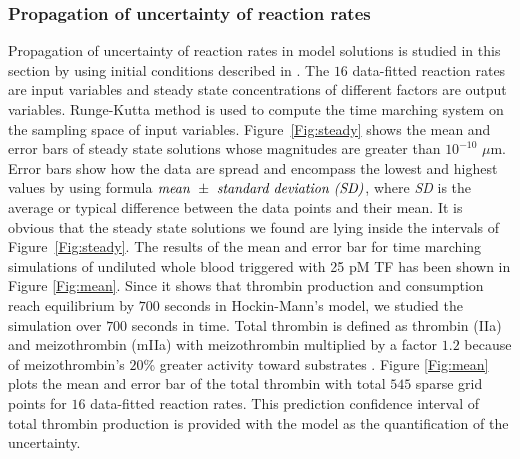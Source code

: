 \subsubsection*{Propagation of uncertainty of reaction rates}
\label{sec:uq}

Propagation of uncertainty of reaction rates in model solutions is
studied in this section by using initial conditions described in
\cite{HocJon02}.  The $16$ data-fitted reaction rates are input
variables and steady state concentrations of different factors are
output variables. Runge-Kutta method is used to compute the time
marching system on the sampling space of input variables.
Figure~\ref{Fig:steady} shows the mean and error bars of steady
state solutions whose magnitudes are greater than $10^{-10}$ $\mu$m.
Error bars show how the data are spread and encompass the lowest and
highest values by using formula $\hbox{\emph{mean}} ~\pm~
\hbox{\emph{standard deviation (SD)}}$, where \emph{SD} is the
average or typical difference between the data points and their
mean. It is obvious that the steady state solutions we found %
are lying inside the intervals of Figure~\ref{Fig:steady}. The
results of the mean and error bar for time marching simulations of
undiluted whole blood triggered with 25 pM TF has been shown in
Figure \ref{Fig:mean}. Since it shows that thrombin production and
consumption reach equilibrium by $700$ seconds in Hockin-Mann's
model, we studied the simulation over $700$ seconds in time. Total
thrombin is defined as thrombin (IIa) and meizothrombin (mIIa) with
meizothrombin multiplied by a factor $1.2$ because of
meizothrombin's $20$\% greater activity toward substrates
\cite{HocJon02}. Figure \ref{Fig:mean} plots the mean and error bar
of the total thrombin with total $545$ sparse grid points for $16$
data-fitted reaction rates.  This prediction confidence interval of
total thrombin production is provided with the model as the
quantification of the uncertainty.


